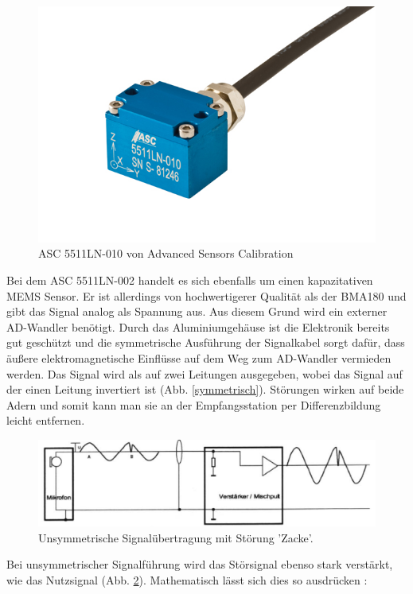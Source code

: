 \documentclass[12pt,a4paper]{scrartcl}
\begin{document}
\begin{figure}[H]
\centering
\includegraphics[scale=.5]{hardwareimages/asc.jpg}
\caption{ASC 5511LN-010 von Advanced Sensors Calibration}
\label{asc5511}
\end{figure}

Bei dem ASC 5511LN-002 handelt es sich ebenfalls um einen kapazitativen MEMS Sensor. Er ist allerdings von hochwertigerer Qualität als der BMA180 und gibt das Signal analog als Spannung aus. Aus diesem Grund wird ein externer AD-Wandler benötigt.
Durch das Aluminiumgehäuse ist die Elektronik bereits gut geschützt und die symmetrische Ausführung der Signalkabel sorgt dafür, dass äußere elektromagnetische Einflüsse auf dem Weg zum AD-Wandler vermieden werden. Das Signal wird als auf zwei Leitungen ausgegeben, wobei das Signal auf der einen Leitung invertiert ist (Abb. \ref{symmetrisch}). Störungen wirken auf beide Adern und somit kann man sie an der Empfangsstation per Differenzbildung leicht entfernen. 
\begin{figure}[H]
\centering
\includegraphics[scale=.7]{unsymmetrisch.png}
\caption{Unsymmetrische Signalübertragung mit Störung 'Zacke'. \citep{Sengpiel:2001fk}}
\label{unsymmetrisch}
\end{figure}


Bei unsymmetrischer Signalführung wird das Störsignal ebenso stark verstärkt, wie das Nutzsignal (Abb. \ref{unsymmetrisch}). Mathematisch lässt sich dies so ausdrücken \citep{Sengpiel:2001fk}:
\end{document}

